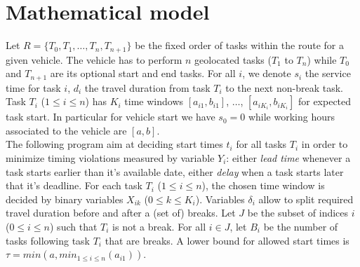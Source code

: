 \documentclass{article}
\begin{document}
\section{Mathematical model}

Let $R=\{T_0, T_1, \ldots, T_n, T_{n + 1}\}$ be the fixed order of
tasks within the route for a given vehicle. The vehicle has to perform
$n$ geolocated tasks ($T_1$ to $T_n$) while $T_0$ and $T_{n + 1}$ are
its optional start and end tasks. For all $i$, we denote $s_i$ the
service time for task $i$, $d_i$ the travel duration from task $T_i$
to the next non-break task. Task $T_i$ ($1\leq i \leq n$) has $K_i$
time windows $[a_{i1}, b_{i1}]$, $\dots$, $[a_{iK_i}, b_{iK_i}]$ for
expected task start. In particular for vehicle start we have $s_0 = 0$
while working hours associated to the vehicle are $[a, b]$.\\

The following program aim at deciding start times $t_i$ for all tasks
$T_i$ in order to minimize timing violations measured by variable
$Y_i$: either \textit{lead time} whenever a task starts earlier than
it's available date, either \textit{delay} when a task starts later
that it's deadline. For each task $T_i$ ($1\leq i\leq n$), the chosen
time window is decided by binary variables $X_{ik}$
($0\leq k \leq K_i$). Variables $\delta_i$ allow to split required
travel duration before and after a (set of) breaks. Let $J$ be the
subset of indices $i$ ($0\leq i \leq n$) such that $T_i$ is not a
break. For all $i\in J$, let $B_i$ be the number of tasks following
task $T_i$ that are breaks. A lower bound for allowed start times is
$\tau = min(a, min_{1\leq i\leq n}(a_{i1}))$.
\end{document}
